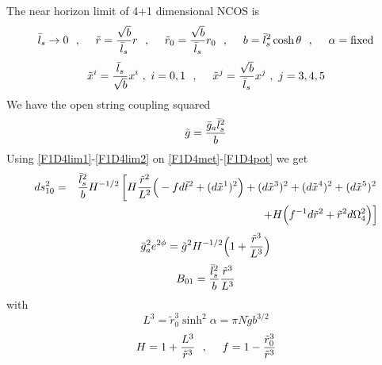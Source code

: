 \documentclass[a4paper,twoside,titlepage,12pt]{article}
\begin{document}
The near horizon limit of 4+1 dimensional NCOS 
is \cite{Gopakumar:2000na,Harmark:2000wv}
%
\begin{equation}
\label{F1D4lim1}
\bar{l}_s \rightarrow 0 \ \ ,\ \ \ \ 
\tilde{r} = \frac{\sqrt{b}}{\bar{l}_s} r \ \ ,\ \ \ \ 
\tilde{r}_0 = \frac{\sqrt{b}}{\bar{l}_s} r_0 \ \ ,\ \ \ \ 
b = \bar{l}_s^2 \cosh \theta \ \ ,\ \ \ \ 
\alpha = \mbox{fixed}
\end{equation}
%
\begin{equation}
\label{F1D4lim2}
\tilde{x}^i = \frac{\bar{l}_s}{\sqrt{b}} x^i \ , \ i=0,1 \ \ ,\ \ \ \ 
\tilde{x}^j = \frac{\sqrt{b}}{\bar{l}_s} x^j \ , \ j=3,4,5 
\end{equation}
%
We have the open string coupling squared 
%
\begin{equation}
\tilde{g} = \frac{\bar{g}_a \bar{l}_s^2}{b}
\end{equation}
%
Using \eqref{F1D4lim1}-\eqref{F1D4lim2} 
on \eqref{F1D4met}-\eqref{F1D4pot} we get \cite{Harmark:2000wv}
%
\begin{eqnarray}
ds_{10}^2 &=& \frac{\bar{l}_s^2}{b} H^{-1/2} \left[ 
H \frac{\tilde{r}^2}{L^2} \Big( - f d\tilde{t}^2 + (d\tilde{x}^1)^2 \Big) 
+ (d\tilde{x}^3)^2 + (d\tilde{x}^4)^2 + (d\tilde{x}^5)^2
\right. \nonumber \\ && \left.
+ H \Big( f^{-1} d\tilde{r}^2 + \tilde{r}^2 d\Omega_4^2 \Big) \right]
\end{eqnarray}
%
\begin{equation}
\bar{g}_a^2 e^{2\phi} = \tilde{g}^2 H^{-1/2} 
\Big( 1 + \frac{\tilde{r}^3}{L^3} \Big)
\end{equation}
%
\begin{equation}
B_{01} = \frac{\bar{l}_s^2}{b} \frac{\tilde{r}^3}{L^3}
\end{equation}
%
with
%
\begin{equation}
L^3 = \tilde{r}_0^3 \sinh^2 \alpha = \pi N \tilde{g} b^{3/2}
\end{equation}
%
\begin{equation}
H = 1 + \frac{L^3}{\tilde{r}^3} \ \ ,\ \ \ \ 
f = 1 - \frac{\tilde{r}_0^3}{\tilde{r}^3}
\end{equation}
%
\end{document}

